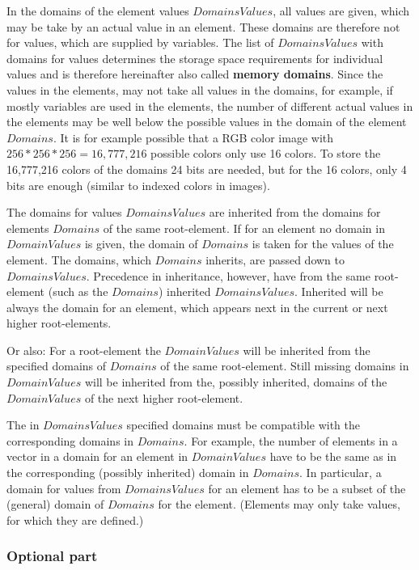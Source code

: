 In the domains of the element values $DomainsValues$, all values are given, which may be take by an actual value in an element. These domains are therefore not for values, which are supplied by variables. The list of $DomainsValues$ with domains for values determines the storage space requirements for individual values and is therefore hereinafter also called \textbf{memory domains}. Since the values in the elements, may not take all values in the domains, for example, if mostly variables are used in the elements, the number of different actual values in the elements may be well below the possible values in the domain of the element $Domains$. It is for example possible that a RGB color image with $256 * 256 * 256 = 16,777,216$ possible colors only use 16 colors. To store the 16,777,216 colors of the domains 24 bits are needed, but for the 16 colors, only 4 bits are enough (similar to indexed colors in images).

The domains for values $DomainsValues$ are inherited from the domains for elements $Domains$ of the same root-element. If for an element no domain in $DomainValues$ is given, the domain of $Domains$ is taken for the values of the element. The domains, which $Domains$ inherits, are passed down to $DomainsValues$. Precedence in inheritance, however, have from the same root-element (such as the $Domains$) inherited $DomainsValues$​. Inherited will be always the domain for an element, which appears next in the current or next higher root-elements.

Or also: For a root-element the $DomainValues$ will be inherited from the specified domains of $Domains$ of the same root-element. Still missing domains in $DomainValues$ will be inherited from the, possibly inherited, domains of the $DomainValues$ of the next higher root-element.

The in $DomainsValues$ specified domains must be compatible with the corresponding domains in $Domains$. For example, the number of elements in a vector in a domain for an element in $DomainValues$ have to be the same as in the corresponding (possibly inherited) domain in $Domains$.
In particular, a domain for values from $DomainsValues$ for an element has to be a subset of the (general) domain of $Domains$ for the element. (Elements may only take values, for which they are defined.)




\subsubsection{Optional part}
\label{root_multimediainfo_opt}

